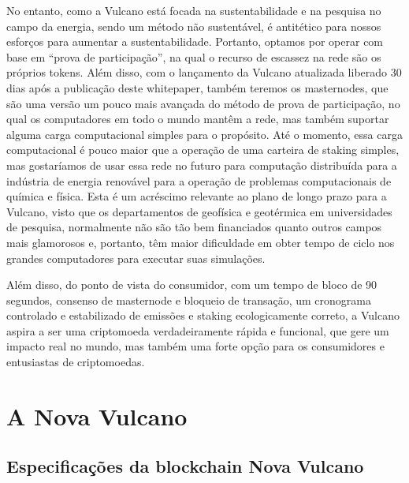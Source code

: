 \documentclass[A4paper, 12pt]{article}
\begin{document}
No entanto, como a Vulcano está focada na sustentabilidade e na pesquisa no campo da energia, sendo um método não sustentável, é antitético para nossos esforços para aumentar a sustentabilidade. Portanto, optamos por operar com base em “prova de participação”, na qual o recurso de escassez na rede são os próprios tokens. Além disso, com o lançamento da Vulcano atualizada liberado 30 dias após a publicação deste whitepaper, também teremos os masternodes, que são uma versão um pouco mais avançada do método de prova de participação, no qual os computadores em todo o mundo mantêm a rede, mas também suportar alguma carga computacional simples para o propósito. Até o momento, essa carga computacional é pouco maior que a operação de uma carteira de staking  simples, mas gostaríamos de usar essa rede no futuro para computação distribuída para a indústria de energia renovável para a operação de problemas computacionais de química e física. Esta é um acréscimo relevante ao plano de longo prazo para a Vulcano, visto que os departamentos de geofísica e geotérmica em universidades de pesquisa, normalmente não são tão bem financiados quanto outros campos mais glamorosos e, portanto, têm maior dificuldade em obter tempo de ciclo nos grandes computadores para executar suas simulações.

Além disso, do ponto de vista do consumidor, com um tempo de bloco de 90 segundos, consenso de masternode e bloqueio de transação, um cronograma controlado e estabilizado de emissões e staking ecologicamente correto, a Vulcano aspira a ser uma criptomoeda verdadeiramente rápida e funcional, que gere um impacto real no mundo, mas também uma forte opção para os consumidores e entusiastas de criptomoedas.


\section{A Nova Vulcano}
\subsection{Especificações da blockchain Nova Vulcano}
\end{document}
